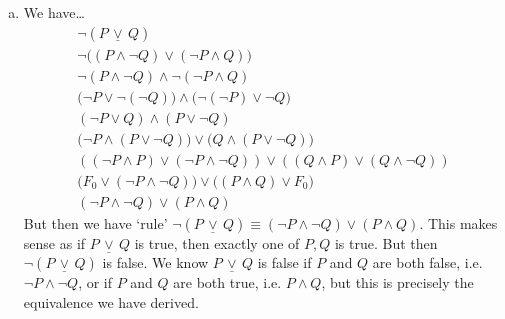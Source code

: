 \documentclass[11pt,letterpaper]{article}
\newcommand{\xor}{\,\underline{\vee}\,}
\begin{document}
\begin{enumerate}[(a)]
\item We have\dots
	\[
	\begin{gathered}
	\neg (P \xor Q) \\[0.3cm]
	\neg \big( (P \wedge \neg Q) \vee (\neg P \wedge Q) \big) \\[0.3cm]
	\neg (P \wedge \neg Q) \wedge \neg (\neg P \wedge Q) \\[0.3cm]
	\big( \neg P \vee \neg (\neg Q) \big) \wedge \big( \neg (\neg P) \vee \neg Q \big) \\[0.3cm]
	(\neg P \vee Q) \wedge (P \vee \neg Q) \\[0.3cm]
	\big( \neg P \wedge (P \vee \neg Q) \big) \vee \big(Q \wedge (P \vee \neg Q) \big) \\[0.3cm]
	\left( (\neg P \wedge P) \vee (\neg P \wedge \neg Q) \right) \vee \left( (Q \wedge P) \vee (Q \wedge \neg Q) \right) \\[0.3cm]
	\big( F_0 \vee (\neg P \wedge \neg Q) \big) \vee \big( (P \wedge Q) \vee F_0 \big) \\[0.3cm]
	(\neg P \wedge \neg Q) \vee (P \wedge Q) 
	\end{gathered}
	\] \pspace
But then we have `rule' $\neg (P \xor Q) \equiv (\neg P \wedge \neg Q) \vee (P \wedge Q)$. This makes sense as if $P \xor Q$ is true, then exactly one of $P, Q$ is true. But then $\neg (P \xor Q)$ is false. We know $P \xor Q$ is false if $P$ and $Q$ are both false, i.e. $\neg P \wedge \neg Q$, or if $P$ and $Q$ are both true, i.e. $P \wedge Q$, but this is precisely the equivalence we have derived. 
\end{enumerate}



\newpage
\end{document}
